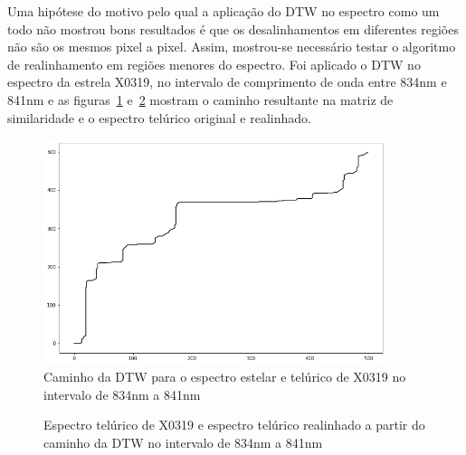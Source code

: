 Uma hipótese do motivo pelo qual a aplicação do DTW no espectro como um todo não mostrou bons resultados é que os desalinhamentos em diferentes regiões não são os mesmos pixel a pixel. Assim, mostrou-se necessário testar o algoritmo de realinhamento em regiões menores do espectro. Foi aplicado o DTW no espectro da estrela X0319, no intervalo de comprimento de onda entre 834nm e 841nm e as figuras~\ref{fig:x0319-warp-path-zoom} e~\ref{fig:x0319-realigned-telluric-zoom} mostram o caminho resultante na matriz de similaridade e o espectro telúrico original e realinhado. 

\begin{figure}[htb]
\centering
\includegraphics[width=10cm]{figuras/x0319_warp_path_zoom.png}
\caption{Caminho da DTW para o espectro estelar e telúrico de X0319 no intervalo de 834nm a 841nm}
\label{fig:x0319-warp-path-zoom}
\end{figure}

\begin{figure}[H]
  \centering
  \hfill
  \caption{Espectro telúrico de X0319 e espectro telúrico realinhado a partir do caminho da DTW no intervalo de 834nm a 841nm}
  \label{fig:x0319-realigned-telluric-zoom}
\end{figure}

